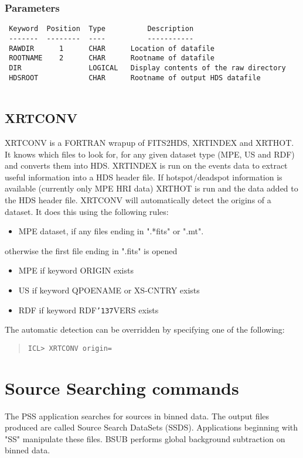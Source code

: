 \documentclass{book}
\renewcommand{\_}{{\tt\char'137}}     %
\begin{document}
\subsection{Parameters}
\begin{verbatim}
 Keyword  Position  Type          Description
 -------  --------  ----          -----------
 RAWDIR      1      CHAR      Location of datafile
 ROOTNAME    2      CHAR      Rootname of datafile
 DIR                LOGICAL   Display contents of the raw directory
 HDSROOT            CHAR      Rootname of output HDS datafile
 
\end{verbatim}\section{XRTCONV}
XRTCONV is a FORTRAN wrapup of FITS2HDS, XRTINDEX and XRTHOT. It
knows which files to look for, for any given dataset type (MPE, US and RDF)
and converts them into HDS. XRTINDEX is run on the events data to
extract useful information into a HDS header file. If hotspot/deadspot
information is available (currently only MPE HRI data) XRTHOT is run
and the data added to the HDS header file.
XRTCONV will automatically detect the origins of a dataset. It does this
using the following rules:
\begin{itemize}
\item MPE dataset, if any files ending in ".*fits" or ".mt".
\end{itemize}
otherwise the first file ending in ".fits" is opened
\begin{itemize}
\item MPE if keyword ORIGIN exists
\item US if keyword QPOENAME or XS-CNTRY exists
\item RDF if keyword RDF\_VERS exists
\end{itemize}
The automatic detection can be overridden by specifying one of the
following:
\begin{quote}\begin{verbatim}
ICL> XRTCONV origin= 
\end{verbatim}\end{quote}
\chapter{Source Searching commands}
The PSS application searches for sources in binned data. The
output files produced are called Source Search DataSets (SSDS).
Applications beginning with "SS" manipulate these files.
BSUB performs global background subtraction on binned data.
 
\end{document}
